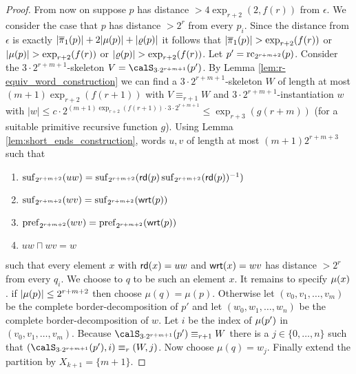 \begin{proof}
	From now on suppose $p$ has distance $> 4\exp_{r+2}(2, f(r))$ from $\epsilon$.
	We consider the case that $p$ has distance $>2^r$ from every $p_i$.
	Since the distance from $\epsilon$ is exactly $|\overline{\pi}_1(p)| + 2|\mu(p)| + |\varrho(p)|$ it follows that $|\overline{\pi}_1(p)| > \exp_{r+2}(f(r))$ or $|\mu(p)| > \exp_{r+2}(f(r))$ or $|\varrho(p)| > \exp_{r+2}(f(r))$. 
	Let $p'= \operatorname{rc}_{2^{r+m+2}}(p)$.  Consider 
	the $3\cdot 2^{r+m+1}$-skeleton $V = \calS_{3\cdot 2^{r+m+1}}(p')$. By Lemma \ref{lem:r-equiv_word_construction} we can find a $3\cdot 2^{r+m+1}$-skeleton $W$ of length at most $(m+1)\exp_{r+2}(f(r+1))$ with $V \equiv_{r+1} W$ and $3\cdot 2^{r+m+1}$-instantiation $w$ with $|w|\leq  c\cdot 2^{(m+1)\exp_{r+2}(f(r+1)) \cdot 3\cdot 2^{r+m+1}}  \leq \exp_{r+3}(g(r+m))$ (for a suitable primitive recursive function $g$). Using Lemma \ref{lem:short_ends_construction}, words $u,v$ of length at most 
	$(m+1)2^{r+m+3}$ such that 
	\begin{enumerate}
		\item $\operatorname{suf}_{2^{r+m+2}}(uw) = \operatorname{suf}_{2^{r+m+2}}(\mathsf{rd}(p)\operatorname{suf}_{2^{r+m+2}}(\mathsf{rd}(p))^{-1} )$
		\item $\operatorname{suf}_{2^{r+m+2}}(wv) = \operatorname{suf}_{2^{r+m+2}}(\mathsf{wrt}(p))$
		\item $\operatorname{pref}_{2^{r+m+2}}(wv) = \operatorname{pref}_{2^{r+m+2}}(\mathsf{wrt}(p))$
		\item $uw\sqcap wv = w$
	\end{enumerate}
    such that every element $x$ with $\mathsf{rd}(x) = uw$ and $\mathsf{wrt}(x) = wv$ has distance $> 2^r$ from every $q_i$.
    We choose to $q$ to be such an element $x$. It remains to specify $\mu(x)$. if $|\mu(p)| \leq 2^{r+m+2}$ then choose $\mu(q) = \mu(p)$. Otherwise
	let $(v_0,v_1,\ldots, v_m)$ be the complete border-decomposition of $p'$ and let $(w_0, w_1,\ldots, w_n)$ be the complete border-decomposition of $w$. Let $i$
	be the index of $\mu(p')$ in $(v_0,v_1,\ldots, v_m)$. Because $\calS_{3\cdot 2^{r+m+1}}(p') \equiv_{r+1} W$ there is a $j\in \{0,\ldots,n\}$ such that $(\calS_{3\cdot 2^{r+m+1}}(p'), i) \equiv_r (W,j)$.
	Now choose $\mu(q) = w_j$. Finally extend the partition by $X_{k+1} = \{m+1\}$.
	

\end{proof}
